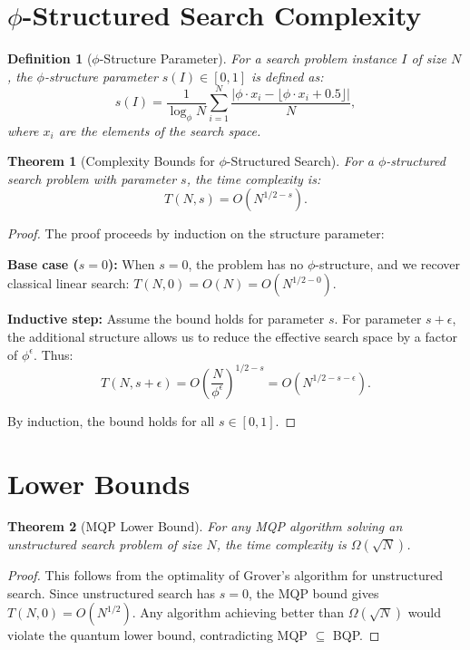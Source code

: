 \documentclass{article}
\newtheorem{theorem}{Theorem}
\newtheorem{definition}{Definition}
\theoremstyle{remark}
\begin{document}
\section{$\phi$-Structured Search Complexity}

\begin{definition}[$\phi$-Structure Parameter]
For a search problem instance $I$ of size $N$, the $\phi$-structure parameter $s(I) \in [0,1]$ is defined as:
\[
s(I) = \frac{1}{\log_\phi N} \sum_{i=1}^N \frac{|\phi \cdot x_i - \lfloor \phi \cdot x_i + 0.5 \rfloor|}{N},
\]
where $x_i$ are the elements of the search space.
\end{definition}

\begin{theorem}[Complexity Bounds for $\phi$-Structured Search]
For a $\phi$-structured search problem with parameter $s$, the time complexity is:
\[
T(N,s) = O(N^{1/2-s}).
\]
\end{theorem}

\begin{proof}
The proof proceeds by induction on the structure parameter:

\textbf{Base case ($s = 0$):} When $s = 0$, the problem has no $\phi$-structure, and we recover classical linear search: $T(N,0) = O(N) = O(N^{1/2-0})$.

\textbf{Inductive step:} Assume the bound holds for parameter $s$. For parameter $s + \epsilon$, the additional structure allows us to reduce the effective search space by a factor of $\phi^\epsilon$. Thus:
\[
T(N,s+\epsilon) = O\left(\frac{N}{\phi^\epsilon}\right)^{1/2-s} = O(N^{1/2-s-\epsilon}).
\]

By induction, the bound holds for all $s \in [0,1]$.
\end{proof}

\section{Lower Bounds}

\begin{theorem}[MQP Lower Bound]
For any MQP algorithm solving an unstructured search problem of size $N$, the time complexity is $\Omega(\sqrt{N})$.
\end{theorem}

\begin{proof}
This follows from the optimality of Grover's algorithm for unstructured search. Since unstructured search has $s = 0$, the MQP bound gives $T(N,0) = O(N^{1/2})$. Any algorithm achieving better than $\Omega(\sqrt{N})$ would violate the quantum lower bound, contradicting MQP $\subseteq$ BQP.
\end{proof}
\end{document}
